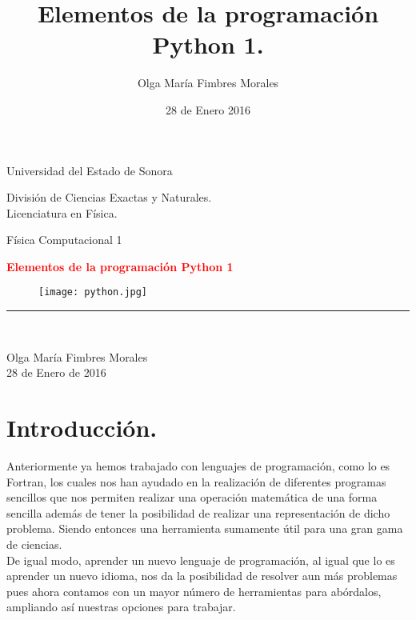\documentclass[12pt]{article}
\title{Elementos de la programación Python 1.}
\author{\textcolor{JungleGreen}{Olga María Fimbres Morales}}
\date{28 de Enero 2016}
\begin{document}
\begin{titlepage}

\begin{center}
\begin{large}
Universidad del Estado de Sonora\\
\end{large}
\vspace*{0.15in}
División de Ciencias Exactas y Naturales.\\
\vspace*{0.15in}
Licenciatura en Física. \\
\vspace*{0.6in}
\begin{large}
Física Computacional 1\\
\end{large}
\vspace*{0.2in}
\begin{Large}
\textbf{{\textcolor{Red}{Elementos de la programación Python 1}}} \\
\end{Large}
\vspace*{0.3in}
\begin{figure}[htb]
\begin{center}
\texttt{[image: python.jpg]}
\end{center}
\end{figure}
\rule{80mm}{0.1mm}\\
\vspace*{0.1in}
\begin{large}
{\textcolor{JungleGreen}{Olga María Fimbres Morales}}\\
28 de Enero de 2016\\
\end{large}
\end{center}
\end{titlepage}

\pagebreak
\section*{Introducción.}
Anteriormente ya hemos trabajado con lenguajes de programación, como lo es Fortran, los cuales nos han ayudado en la realización de diferentes programas sencillos que nos permiten realizar una operación matemática de una forma sencilla además de tener la posibilidad de realizar una representación de dicho problema. Siendo entonces una herramienta sumamente útil para una gran gama de ciencias.\\
De igual modo, aprender un nuevo lenguaje de programación, al igual que lo es aprender un nuevo idioma, nos da la posibilidad de resolver aun más problemas pues ahora contamos con un mayor número de herramientas para abórdalos, ampliando así nuestras opciones para trabajar.
\end{document}
